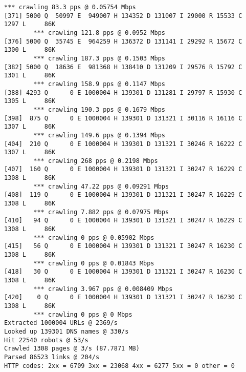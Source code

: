 \documentclass[11pt]{article}
\begin{document}
\begin{lstlisting}[label=app-trace,caption=Output of Homework 1]
        *** crawling 83.3 pps @ 0.05754 Mbps
[371] 5000 Q  50997 E  949007 H 134352 D 131007 I 29000 R 15533 C  1297 L     86K
        *** crawling 121.8 pps @ 0.0952 Mbps
[376] 5000 Q  35745 E  964259 H 136372 D 131141 I 29292 R 15672 C  1300 L     86K
        *** crawling 187.3 pps @ 0.1503 Mbps
[382] 5000 Q  18636 E  981368 H 138410 D 131209 I 29576 R 15792 C  1301 L     86K
        *** crawling 158.9 pps @ 0.1147 Mbps
[388] 4293 Q      0 E 1000004 H 139301 D 131281 I 29797 R 15930 C  1305 L     86K
        *** crawling 190.3 pps @ 0.1679 Mbps
[398]  875 Q      0 E 1000004 H 139301 D 131321 I 30116 R 16116 C  1307 L     86K
        *** crawling 149.6 pps @ 0.1394 Mbps
[404]  210 Q      0 E 1000004 H 139301 D 131321 I 30246 R 16222 C  1307 L     86K
        *** crawling 268 pps @ 0.2198 Mbps
[407]  160 Q      0 E 1000004 H 139301 D 131321 I 30247 R 16229 C  1308 L     86K
        *** crawling 47.22 pps @ 0.09291 Mbps
[408]  119 Q      0 E 1000004 H 139301 D 131321 I 30247 R 16229 C  1308 L     86K
        *** crawling 7.882 pps @ 0.07975 Mbps
[410]   94 Q      0 E 1000004 H 139301 D 131321 I 30247 R 16229 C  1308 L     86K
        *** crawling 0 pps @ 0.05902 Mbps
[415]   56 Q      0 E 1000004 H 139301 D 131321 I 30247 R 16230 C  1308 L     86K
        *** crawling 0 pps @ 0.01843 Mbps
[418]   30 Q      0 E 1000004 H 139301 D 131321 I 30247 R 16230 C  1308 L     86K
        *** crawling 3.967 pps @ 0.008409 Mbps
[420]    0 Q      0 E 1000004 H 139301 D 131321 I 30247 R 16230 C  1308 L     86K
        *** crawling 0 pps @ 0 Mbps
Extracted 1000004 URLs @ 2369/s
Looked up 139301 DNS names @ 330/s
Hit 22540 robots @ 53/s
Crawled 1308 pages @ 3/s (87.7871 MB)
Parsed 86523 links @ 204/s
HTTP codes: 2xx = 6709 3xx = 23068 4xx = 6277 5xx = 0 other = 0
\end{lstlisting}
\end{document}
